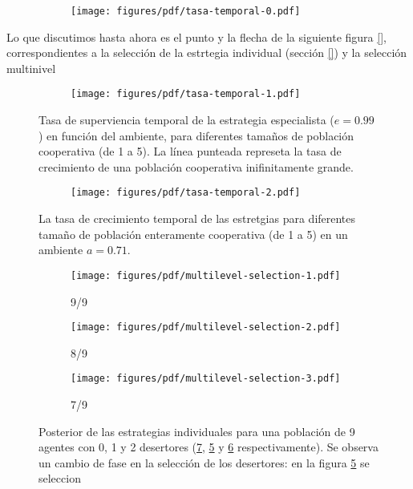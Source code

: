 \documentclass[a4paper,10pt]{article}
\begin{document}
\begin{figure}[H]
    \centering
    \begin{subfigure}[b]{0.66\textwidth}
    \texttt{[image: figures/pdf/tasa-temporal-0.pdf]}
    \end{subfigure}
    \caption{}
    \label{fig:fitness_temporal}
\end{figure}

Lo que discutimos hasta ahora es el punto y la flecha de la siguiente figura \ref{}, correspondientes a la selección de la estrtegia individual (sección \ref{}) y la selección multinivel 


\begin{figure}[H]
    \centering
    \begin{subfigure}[b]{0.66\textwidth}
    \texttt{[image: figures/pdf/tasa-temporal-1.pdf]}
    \end{subfigure}
    \caption{
    Tasa de superviencia temporal de la estrategia especialista ($e=0.99$) en función del ambiente, para diferentes tamaños de población cooperativa (de 1 a 5).
    La línea punteada represeta la tasa de crecimiento de una población cooperativa inifinitamente grande.
    }
    \label{fig:multilevel-selection-1}
\end{figure}


\begin{figure}[H]
    \centering
    \begin{subfigure}[b]{0.66\textwidth}
    \texttt{[image: figures/pdf/tasa-temporal-2.pdf]}
    \end{subfigure}
    \caption{
    La tasa de crecimiento temporal de las estretgias para diferentes tamaño de población enteramente cooperativa (de 1 a 5) en un ambiente $a=0.71$.
    }
    \label{fig:multilevel-selection-1}
\end{figure}


\begin{figure}[H]
    \centering
    \begin{subfigure}[b]{0.32\textwidth}
    \texttt{[image: figures/pdf/multilevel-selection-1.pdf]}
    \caption{9/9}
    \label{fig:multilevel-selection-1}
    \end{subfigure}
    \begin{subfigure}[b]{0.32\textwidth}
    \texttt{[image: figures/pdf/multilevel-selection-2.pdf]}
    \caption{8/9}
    \label{fig:multilevel-selection-2}
    \end{subfigure}
    \begin{subfigure}[b]{0.32\textwidth}
    \texttt{[image: figures/pdf/multilevel-selection-3.pdf]}
    \caption{7/9}
    \label{fig:multilevel-selection-3}
    \end{subfigure}
    \caption{
    Posterior de las estrategias individuales para una población de 9 agentes con 0, 1 y 2 desertores (\ref{fig:multilevel-selection-1}, \ref{fig:multilevel-selection-2} y \ref{fig:multilevel-selection-3} respectivamente).
    Se observa un cambio de fase en la selección de los desertores: en la figura \ref{fig:multilevel-selection-2} se seleccion
    }
    \label{fig:multilevel-selection-1}
\end{figure}
\end{document}
